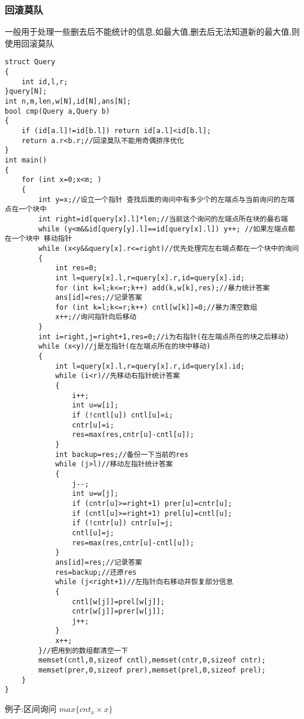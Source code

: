 \documentclass[a4paper]{ctexart}
\begin{document}
\subsubsection{回滚莫队}
一般用于处理一些删去后不能统计的信息,如最大值,删去后无法知道新的最大值,则使用回滚莫队
\begin{lstlisting}
struct Query
{
	int id,l,r;
}query[N];
int n,m,len,w[N],id[N],ans[N];
bool cmp(Query a,Query b)
{
	if (id[a.l]!=id[b.l]) return id[a.l]<id[b.l];
	return a.r<b.r;//回滚莫队不能用奇偶排序优化
}
int main()
{
    for (int x=0;x<m; )
	{
		int y=x;//设立一个指针 查找后面的询问中有多少个的左端点与当前询问的左端点在一个块中
		int right=id[query[x].l]*len;//当前这个询问的左端点所在块的最右端
		while (y<m&&id[query[y].l]==id[query[x].l]) y++; //如果左端点都在一个块中 移动指针
		while (x<y&&query[x].r<=right)//优先处理完左右端点都在一个块中的询问
		{
			int res=0;
			int l=query[x].l,r=query[x].r,id=query[x].id;
			for (int k=l;k<=r;k++) add(k,w[k],res);//暴力统计答案
			ans[id]=res;//记录答案
			for (int k=l;k<=r;k++) cntl[w[k]]=0;//暴力清空数组
			x++;//询问指针向后移动
		}
		int i=right,j=right+1,res=0;//i为右指针(在左端点所在的块之后移动)
		while (x<y)//j是左指针(在左端点所在的块中移动)
		{
			int l=query[x].l,r=query[x].r,id=query[x].id;
			while (i<r)//先移动右指针统计答案
			{
				i++;
				int u=w[i];
				if (!cntl[u]) cntl[u]=i;
				cntr[u]=i;
				res=max(res,cntr[u]-cntl[u]);
			}
			int backup=res;//备份一下当前的res
			while (j>l)//移动左指针统计答案
			{
				j--;
				int u=w[j];
				if (cntr[u]>=right+1) prer[u]=cntr[u];
				if (cntl[u]>=right+1) prel[u]=cntl[u];
				if (!cntr[u]) cntr[u]=j;
				cntl[u]=j;
				res=max(res,cntr[u]-cntl[u]);
			}
			ans[id]=res;//记录答案
			res=backup;//还原res
			while (j<right+1)//左指针向右移动并恢复部分信息
			{
				cntl[w[j]]=prel[w[j]];
				cntr[w[j]]=prer[w[j]];
				j++;
			}
			x++;
		}//把用到的数组都清空一下
		memset(cntl,0,sizeof cntl),memset(cntr,0,sizeof cntr);
		memset(prer,0,sizeof prer),memset(prel,0,sizeof prel);
	}
}
\end{lstlisting}
例子:区间询问 $max\{cnt_x\times x\}$
\end{document}
